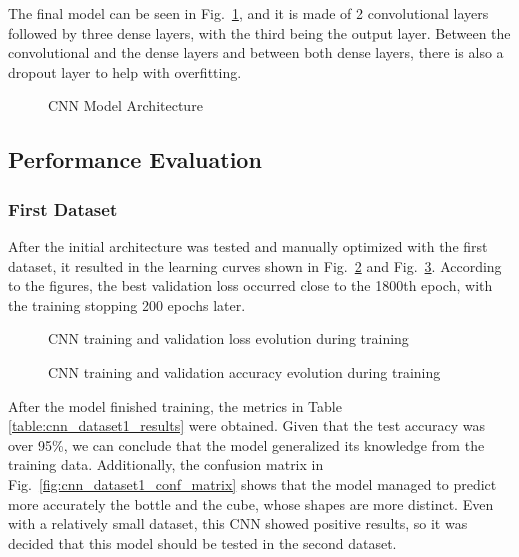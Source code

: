The final model can be seen in Fig.~\ref{fig:cnn_architecture}, and it is made of 2 convolutional layers followed by three dense layers, with the third being the output layer. Between the convolutional and the dense layers and between both dense layers, there is also a dropout layer to help with overfitting.

\begin{figure}[H]
    \centering
    {\fontsize{10}{12}\selectfont}
    \caption[CNN Model Architecture]{CNN Model Architecture}
    \label{fig:cnn_architecture}
\end{figure}

\subsection{Performance Evaluation}

\subsubsection{First Dataset}

After the initial architecture was tested and manually optimized with the first dataset, it resulted in the learning curves shown in Fig.~\ref{fig:cnn_dataset1_loss} and Fig.~\ref{fig:cnn_dataset1_acc}. According to the figures, the best validation loss occurred close to the 1800th epoch, with the training stopping 200 epochs later.

\begin{figure}[H]
    \centering
    {\fontsize{10}{12}\selectfont}
    \caption[CNN training and validation loss evolution during training]{CNN training and validation loss evolution during training}
    \label{fig:cnn_dataset1_loss}
\end{figure}

\begin{figure}[H]
    \centering
    {\fontsize{10}{12}\selectfont}
    \caption[CNN training and validation accuracy evolution during training]{CNN training and validation accuracy evolution during training}
    \label{fig:cnn_dataset1_acc}
\end{figure}

After the model finished training, the metrics in Table \ref{table:cnn_dataset1_results} were obtained. Given that the test accuracy was over 95\%, we can conclude that the model generalized its knowledge from the training data. Additionally, the confusion matrix in Fig.~\ref{fig:cnn_dataset1_conf_matrix} shows that the model managed to predict more accurately the bottle and the cube, whose shapes are more distinct. Even with a relatively small dataset, this CNN showed positive results, so it was decided that this model should be tested in the second dataset.

